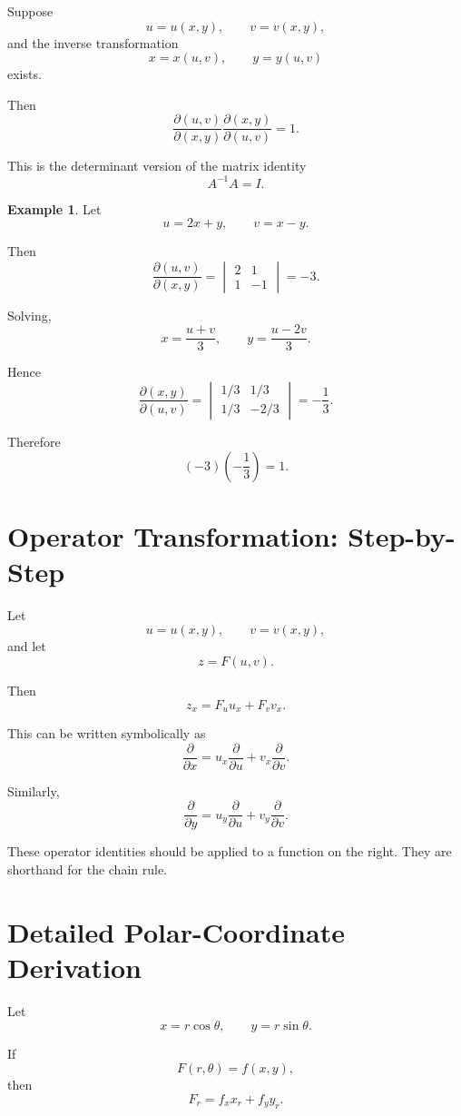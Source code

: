 \documentclass[11pt,oneside]{book}
\theoremstyle{studentthm}
\theoremstyle{definition}
\newtheorem{example}[theorem]{Example}
\begin{document}
Suppose
\[
u=u(x,y),
\qquad
v=v(x,y),
\]
and the inverse transformation
\[
x=x(u,v),
\qquad
y=y(u,v)
\]
exists.

Then
\[
\frac{\partial(u,v)}{\partial(x,y)}
\frac{\partial(x,y)}{\partial(u,v)}
=1.
\]

This is the determinant version of the matrix identity
\[
A^{-1}A=I.
\]

\begin{example}
Let
\[
u=2x+y,
\qquad
v=x-y.
\]

Then
\[
\frac{\partial(u,v)}{\partial(x,y)}
=
\begin{vmatrix}
2&1\\
1&-1
\end{vmatrix}
=-3.
\]

Solving,
\[
x=\frac{u+v}{3},
\qquad
y=\frac{u-2v}{3}.
\]

Hence
\[
\frac{\partial(x,y)}{\partial(u,v)}
=
\begin{vmatrix}
1/3&1/3\\
1/3&-2/3
\end{vmatrix}
=
-\frac13.
\]

Therefore
\[
(-3)\left(-\frac13\right)=1.
\]
\end{example}

\section{Operator Transformation: Step-by-Step}

Let
\[
u=u(x,y),
\qquad
v=v(x,y),
\]
and let
\[
z=F(u,v).
\]

Then
\[
z_x
=
F_u u_x+F_v v_x.
\]

This can be written symbolically as
\[
\frac{\partial}{\partial x}
=
u_x\frac{\partial}{\partial u}
+
v_x\frac{\partial}{\partial v}.
\]

Similarly,
\[
\frac{\partial}{\partial y}
=
u_y\frac{\partial}{\partial u}
+
v_y\frac{\partial}{\partial v}.
\]

These operator identities should be applied to a function on the
right. They are shorthand for the chain rule.

\section{Detailed Polar-Coordinate Derivation}

Let
\[
x=r\cos\theta,\qquad y=r\sin\theta.
\]

If
\[
F(r,\theta)=f(x,y),
\]
then
\[
F_r
=
f_xx_r+f_yy_r.
\]
\end{document}
